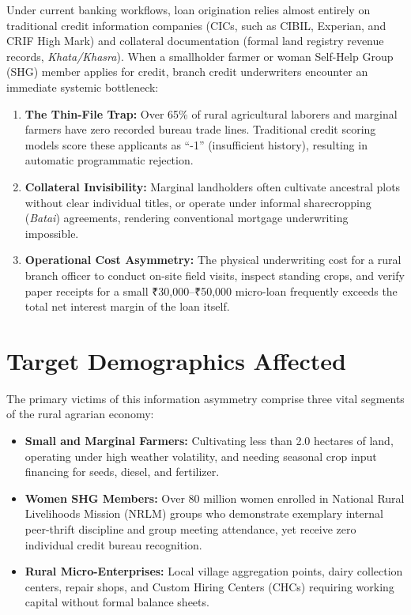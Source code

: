 \documentclass[11pt,a4paper,oneside]{report}
\begin{document}
Under current banking workflows, loan origination relies almost entirely on traditional credit information companies (CICs, such as CIBIL, Experian, and CRIF High Mark) and collateral documentation (formal land registry revenue records, \textit{Khata/Khasra}). When a smallholder farmer or woman Self-Help Group (SHG) member applies for credit, branch credit underwriters encounter an immediate systemic bottleneck:
\begin{enumerate}
  \item \textbf{The Thin-File Trap:} Over 65\% of rural agricultural laborers and marginal farmers have zero recorded bureau trade lines. Traditional credit scoring models score these applicants as ``-1'' (insufficient history), resulting in automatic programmatic rejection.
  \item \textbf{Collateral Invisibility:} Marginal landholders often cultivate ancestral plots without clear individual titles, or operate under informal sharecropping (\textit{Batai}) agreements, rendering conventional mortgage underwriting impossible.
  \item \textbf{Operational Cost Asymmetry:} The physical underwriting cost for a rural branch officer to conduct on-site field visits, inspect standing crops, and verify paper receipts for a small ₹30,000--₹50,000 micro-loan frequently exceeds the total net interest margin of the loan itself.
\end{enumerate}

\section{Target Demographics Affected}
The primary victims of this information asymmetry comprise three vital segments of the rural agrarian economy:
\begin{itemize}
  \item \textbf{Small and Marginal Farmers:} Cultivating less than 2.0 hectares of land, operating under high weather volatility, and needing seasonal crop input financing for seeds, diesel, and fertilizer.
  \item \textbf{Women SHG Members:} Over 80 million women enrolled in National Rural Livelihoods Mission (NRLM) groups who demonstrate exemplary internal peer-thrift discipline and group meeting attendance, yet receive zero individual credit bureau recognition.
  \item \textbf{Rural Micro-Enterprises:} Local village aggregation points, dairy collection centers, repair shops, and Custom Hiring Centers (CHCs) requiring working capital without formal balance sheets.
\end{itemize}
\end{document}
